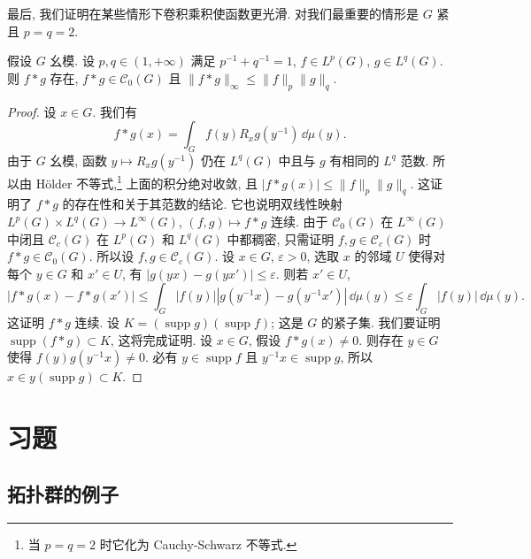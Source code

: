 最后, 我们证明在某些情形下卷积乘积使函数更光滑. 对我们最重要的情形是 $G$ 紧且 $p = q = 2$.

\begin{proposition}[卷积使函数光滑]
\label{prop:I.4.3.4}
假设 $G$ 幺模. 设 $p, q \in (1, +\infty)$ 满足 $p^{-1} + q^{-1} = 1$, $f \in L^p(G)$, $g \in L^q(G)$.
则 $f * g$ 存在, $f * g \in \mathcal{C}_0(G)$ 且 $\|f * g\|_{\infty} \leq \|f\|_p\|g\|_q$.
\end{proposition}

\begin{proof}
设 $x \in G$. 我们有
\[
f * g(x) = \int_G f(y)R_xg(y^{-1})\,\dd\mu(y).
\]
由于 $G$ 幺模, 函数 $y \longmapsto R_xg(y^{-1})$ 仍在 $L^q(G)$ 中且与 $g$ 有相同的 $L^q$ 范数. 所以由 H\"older 不等式,\footnote{当 $p = q = 2$ 时它化为 Cauchy-Schwarz 不等式.} 上面的积分绝对收敛, 且 $|f * g(x)| \leq \|f\|_p\|g\|_q$. 这证明了 $f * g$ 的存在性和关于其范数的结论. 它也说明双线性映射 $L^p(G) \times L^q(G) \to L^{\infty}(G)$, $(f, g) \longmapsto f * g$ 连续. 由于 $\mathcal{C}_0(G)$ 在 $L^{\infty}(G)$ 中闭且 $\mathcal{C}_c(G)$ 在 $L^p(G)$ 和 $L^q(G)$ 中都稠密, 只需证明 $f, g \in \mathcal{C}_c(G)$ 时 $f * g \in \mathcal{C}_0(G)$.
所以设 $f, g \in \mathcal{C}_c(G)$. 设 $x \in G$, $\varepsilon > 0$, 选取 $x$ 的邻域 $U$ 使得对每个 $y \in G$ 和 $x' \in U$, 有 $|g(yx) - g(yx')| \leq \varepsilon$. 则若 $x' \in U$,
\[
|f * g(x) - f * g(x')| \leq \int_G |f(y)||g(y^{-1}x) - g(y^{-1}x')|\,\dd\mu(y) \leq \varepsilon \int_G |f(y)|\,\dd\mu(y).
\]
这证明 $f * g$ 连续. 设 $K = (\operatorname{supp} g)(\operatorname{supp} f)$; 这是 $G$ 的紧子集. 我们要证明 $\operatorname{supp}(f * g) \subset K$, 这将完成证明. 设 $x \in G$, 假设 $f * g(x) \neq 0$. 则存在 $y \in G$ 使得 $f(y)g(y^{-1}x) \neq 0$. 必有 $y \in \operatorname{supp} f$ 且 $y^{-1}x \in \operatorname{supp} g$, 所以 $x \in y(\operatorname{supp} g) \subset K$.
\end{proof}

\section{习题}

\subsection{拓扑群的例子}


